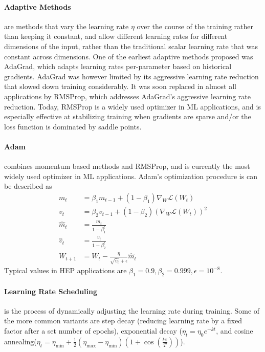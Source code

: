             \paragraph{Adaptive Methods}are methods that vary the learning rate \(\eta\) over the course of the training rather than keeping it constant, and allow different learning rates for different dimensions of the input, rather than the traditional scalar learning rate that was constant across dimensions.
                One of the earliest adaptive methods proposed was AdaGrad, which adapts learning rates per-parameter based on historical gradients.
                AdaGrad was however limited by its aggressive learning rate reduction that slowed down training considerably.
                It was soon replaced in almost all applications by RMSProp, which addresses AdaGrad's aggressive learning rate reduction.
                Today, RMSProp is a widely used optimizer in ML applications, and is especially effective at stabilizing training when gradients are sparse and/or the loss function is dominated by saddle points.
            
            \paragraph{Adam}combines momentum based methods and RMSProp, and is currently the most widely used optimizer in ML applications.
                Adam's optimization procedure is can be described as
                 \begin{align}
                     m_t &= \beta_1 m_{t-1} + (1 - \beta_1) \nabla_W \mathcal{L}(W_t) \\
                     v_t &= \beta_2 v_{t-1} + (1 - \beta_2) (\nabla_W\mathcal{L}(W_t))^2 \\
                     \hat{m}_t &= \frac{m_t}{1 - \beta_1^t} \\
                     \hat{v}_t &= \frac{v_t}{1 - \beta_2^t} \\
                     W_{t+1} &= W_t - \frac{\eta}{\sqrt{\hat{v}_t} + \epsilon} \hat{m}_t
                 \end{align}
                Typical values in HEP applications are \(\beta_1 = 0.9, \beta_2 = 0.999, \epsilon = 10^{-8}\).
            
            
            
            \paragraph{Learning Rate Scheduling}is the process of dynamically adjusting the learning rate during training.
                Some of the more common variants are step decay (reducing learning rate by a fixed factor after a set number of epochs), exponential decay (\(\eta_t = \eta_0 e^{-kt}\), and cosine annealing(\(\eta_t = \eta_{\min} + \frac{1}{2}(\eta_{\max} - \eta_{\min})(1 + \cos(\frac{t\pi}{T}))\)).
